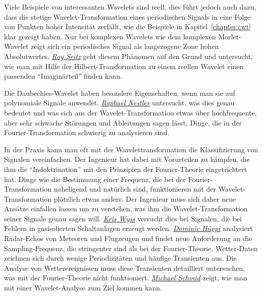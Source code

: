 Viele Beispiele von interessanten Wavelets sind reell, dies führt jedoch
auch dazu, dass die stetige Wavelet-Transformation eines periodischen Signals
in eine Folge von Punkten hoher Intensität zerfällt, wie die Beispiele
in Kapitel~\ref{chapter:cwt} klar gezeigt haben.
Nur bei komplexen Wavelets wie dem komplexen Morlet-Wavelet zeigt sich 
ein periodisches Signal als langezogene Zone hohen Absolutwertes.
\hyperref[chapter:complex]{\em Roy Seitz} geht diesem Phänomen auf den
Grund und untersucht, wie man mit Hilfe der Hilbert-Transformation zu
einem reellen Wavelet einen passenden ``Imaginärteil'' finden kann.

Die Daubechies-Wavelet haben besondere Eigenschaften, wenn man sie
auf polynomiale Signale anwendet.
\hyperref[chapter:polynomials]{\em Raphael Nestler} untersucht, was dies genau bedeutet und was
sich aus der Wavelet-Transformation etwas über hochfrequente, aber sehr
schwache Störungen und Ableitungen sagen lässt, Dinge, die in der
Fourier-Transformation schwierig zu analysieren sind.

In der Praxis kann man oft mit der Wavelettransformation die
Klassifizierung von Signalen vereinfachen.
Der Ingenieur hat dabei mit Vorurteilen zu kämpfen, die ihm die
``Indoktrination'' mit den Prinzipien der Fourier-Theorie eingetrichtert hat.
Dinge wie die Bestimmung einer Frequenz, die bei der Fourier-Transformation
naheligend und natürlich sind, funktionieren mit der Wavelet-Transformation
plötzlich etwas anders.
Der Ingenieur muss sich daher neue Ansätze einfallen lassen um zu verstehen,
was ihm die Wavelet-Transformation seiner Signale genau sagen will.
\hyperref[chapter:gis]{\em Kris Wyss} versucht dies bei Signalen, die bei
Fehlern in gasisolierten Schaltanlagen erzeugt werden.
\hyperref[chapters:meteor]{\em Dominic Hüppi} analysiert Radar-Echos von
Meteoren und Flugzeugen und findet neue Anforderung an die Sampling-Frequenz,
die stringenter sind als bei der Fourier-Theorie.
Wetter-Daten zeichnen sich durch wenige Periodizitäten und häufige
Transienten aus.
Die Analyse von Wetterereignissen muss diese Transienten detailliert
untersuchen, was mit der Fourier-Theorie nicht funktioniert.
\hyperref[chapter:wwt]{\em Michael Schmid} zeigt, wie man mit einer
Wavelet-Analyse zum Ziel kommen kann.

